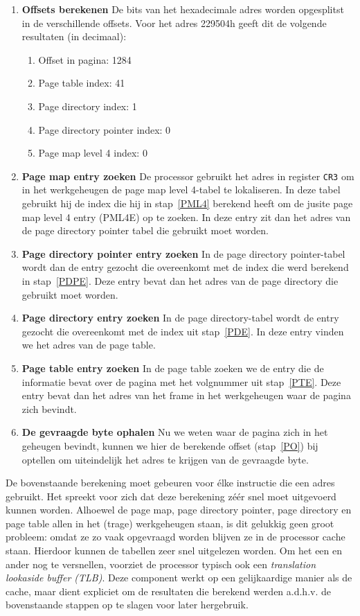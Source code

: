 \begin{enumerate}
\item{\textbf{Offsets berekenen}} De bits van het hexadecimale adres worden opgesplitst in de verschillende offsets. Voor het adres 229504h geeft dit de volgende resultaten (in decimaal):
    \begin{enumerate}
    \item{Offset in pagina:}\label{PO} 1284
    \item{Page table index:}\label{PTE} 41
    \item{Page directory index:}\label{PDE} 1
    \item{Page directory pointer index:}\label{PDPE} 0
    \item{Page map level 4 index:}\label{PML4} 0
    \end{enumerate}
\item{\textbf{Page map entry zoeken}} De processor gebruikt het adres in register \texttt{CR3} om in het werkgeheugen de page map level 4-tabel te lokaliseren. In deze tabel gebruikt hij de index die hij in stap~\ref{PML4} berekend heeft om de jusite page map level 4 entry (PML4E) op te zoeken. In deze entry zit dan het adres van de page directory pointer tabel die gebruikt moet worden.
\item{\textbf{Page directory pointer entry zoeken}} In de page directory pointer-tabel wordt dan de entry gezocht die overeenkomt met de index die werd berekend in stap~\ref{PDPE}. Deze entry bevat dan het adres van de page directory die gebruikt moet worden.
\item{\textbf{Page directory entry zoeken}} In de page directory-tabel wordt de entry gezocht die overeenkomt met de index uit stap~\ref{PDE}. In deze entry vinden we het adres van de page table.
\item{\textbf{Page table entry zoeken}} In de page table zoeken we de entry die de informatie bevat over de pagina met het volgnummer uit stap~\ref{PTE}. Deze entry bevat dan het adres van het frame in het werkgeheugen waar de pagina zich bevindt.
\item{\textbf{De gevraagde byte ophalen}} Nu we weten waar de pagina zich in het geheugen bevindt, kunnen we hier de berekende offset (stap~\ref{PO}) bij optellen om uiteindelijk het adres te krijgen van de gevraagde byte.
\end{enumerate}

De bovenstaande berekening moet gebeuren voor \'elke instructie die een adres gebruikt. Het spreekt voor zich dat deze berekening z\'e\'er snel moet uitgevoerd kunnen worden. Alhoewel de page map, page directory pointer, page directory en page table allen in het (trage) werkgeheugen staan, is dit gelukkig geen groot probleem: omdat ze zo vaak opgevraagd worden blijven ze in de processor cache staan. Hierdoor kunnen de tabellen zeer snel uitgelezen worden. Om het een en ander nog te versnellen, voorziet de processor typisch ook een \emph{translation lookaside buffer (TLB)}. Deze component werkt op een gelijkaardige manier als de cache, maar dient expliciet om de resultaten die berekend werden a.d.h.v. de bovenstaande stappen op te slagen voor later hergebruik.

